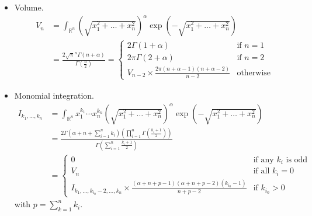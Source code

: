 \documentclass[draft]{scrartcl}
\begin{document}
\begin{itemize}
  \item Volume.
    \begin{align}\nonumber
  V_n
    &= \int_{\mathbb{R}^n} \left(\sqrt{x_1^2+\dots+x_n^2}\right)^\alpha \exp\left(-\sqrt{x_1^2+\dots+x_n^2}\right)\\
    &= \frac{2 \sqrt{\pi}^n \Gamma(n+\alpha)}{\Gamma(\frac{n}{2})}
  = \begin{cases}
    2\Gamma(1+\alpha)&\text{if $n=1$}\\
    2\pi\Gamma(2 + \alpha)&\text{if $n=2$}\\
    V_{n-2} \times \frac{2\pi(n+\alpha-1) (n+\alpha-2)}{n-2}&\text{otherwise}
  \end{cases}
\end{align}

\item Monomial integration.
    \begin{align}\nonumber
  I_{k_1,\dots,k_n}
  &= \int_{\mathbb{R}^n} x_1^{k_1}\cdots x_n^{k_n}
    \left(\sqrt{x_1^2+\dots+x_n^2}\right)^\alpha \exp\left(-\sqrt{x_1^2+\dots+x_n^2}\right)\\
  &= \frac{
    2 \Gamma\left(\alpha + n + \sum_{i=1}^n k_i\right)
    \left(\prod_{i=1}^n\Gamma\left(\frac{k_i + 1}{2}\right)\right)
  }{
    \Gamma\left(\sum_{i=1}^n\frac{k_i + 1}{2}\right)
  }\\
  &=\begin{cases}
    0&\text{if any $k_i$ is odd}\\
    V_n&\text{if all $k_i=0$}\\
    I_{k_1,\dots,k_{i_0}-2,\dots,k_n} \times \frac{
      (\alpha + n + p - 1) (\alpha + n + p - 2) (k_{i_0} - 1)
    }{
        n + p - 2
    }&\text{if $k_{i_0} > 0$}
  \end{cases}
\end{align}
with $p=\sum_{k=1}^n k_i$.
\end{itemize}
\end{document}
